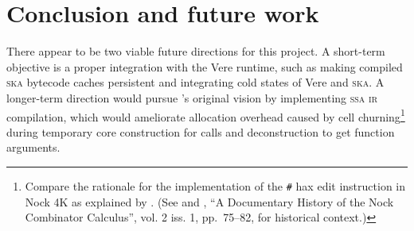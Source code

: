 \documentclass[twoside]{article}
\begin{document}
\section{Conclusion and future work}
There appear to be two viable future directions for this project.  A short-term objective is a proper integration with the Vere runtime, such as making compiled \textsc{ska} bytecode caches {persistent} and integrating cold states of Vere and \textsc{ska}.  A longer-term direction would pursue 's original vision by implementing \textsc{ssa ir} compilation, which would ameliorate \mbox{allocation} overhead caused by cell churning\footnote{Compare the rationale for the implementation of the \lstinline[style=inlinecode]{#} hax edit instruction in Nock 4K as explained by .  (See  and , ``A Documentary History of the Nock Combinator Calculus'',  vol. 2 iss. 1, pp.~75–82, for historical context.)} during temporary core construction for calls and deconstruction to get function arguments.\tombstone

\printbibliography
\end{document}
